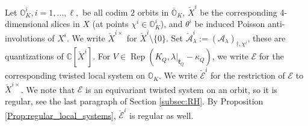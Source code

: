 \documentclass[12pt]{amsart}
\newcommand{\C}{\mathbb{C}}
\newcommand{\A}{\mathcal{A}}
\newcommand{\Orb}{\mathbb{O}}
\newcommand{\kf}{\mathfrak{k}}
\theoremstyle{definition}
\numberwithin{equation}{section}
\begin{document}
Let $\Orb_K^{i},i=1,\ldots,\ell,$ be all
codim $2$ orbits in $\overline{\Orb}_K$, $\check{X}^i$ be the corresponding
4-dimensional slices in $X$ (at points $\chi^i\in \Orb_K^i$), and $\theta^i$ be induced Poisson anti-involutions of $X^i$. We write $\check{X}^{i\times}$ for $\check{X}^i\setminus \{0\}$.
Set $\check{\A}^i_\lambda:=(\A_\lambda)_{\dagger,\chi^i}$, these are quantizations of $\C[\check{X}^i]$.
For $V\in \operatorname{Rep}(K_Q,\lambda|_{\kf_Q}-\kappa_Q)$, we write $\mathcal{E}$ for the corresponding
twisted local system on $\Orb_K$. We write $\check{\mathcal{E}}^i$ for the restriction of $\mathcal{E}$ to $\check{X}^{i\times}$. We note that $\mathcal{E}$ is an equivariant twisted system on an orbit,
so it is regular, see the last paragraph of Section \ref{subsec:RH}. By Proposition \ref{Prop:regular_local_systems}, $\check{\mathcal{E}}^i$ is regular as well.
\end{document}
